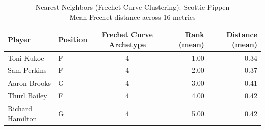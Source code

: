 \begin{table}[t]
\caption*{
{\fontsize{20}{25} Nearest Neighbors (Frechet Curve Clustering): Scottie Pippen\fontsize{12}{15}\selectfont } \\ 
{\fontsize{14}{17}\selectfont  Mean Frechet distance across 16 metrics\fontsize{12}{15}\selectfont }
} 
\fontsize{12.0pt}{14.0pt}\selectfont
\begin{tabular*}{\linewidth}{@{\extracolsep{\fill}}llcrr}
\toprule
Player & Position & Frechet Curve Archetype & Rank (mean) & Distance (mean) \\ 
\midrule\addlinespace[2.5pt]
Toni Kukoc & F & 4 & 1.00 & 0.34 \\ 
Sam Perkins & F & 4 & 2.00 & 0.37 \\ 
Aaron Brooks & G & 4 & 3.00 & 0.41 \\ 
Thurl Bailey & F & 4 & 4.00 & 0.42 \\ 
Richard Hamilton & G & 4 & 5.00 & 0.42 \\ 
\bottomrule
\end{tabular*}
\end{table}

